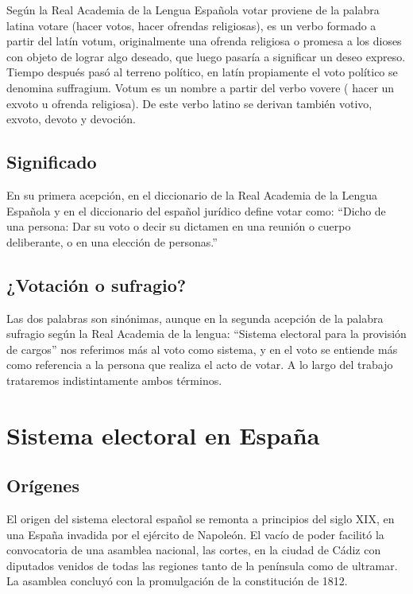 \documentclass[12pt,a4paper,]{book}
\numberwithin{dummy}{section}
\theoremstyle{ocrenumbox}
\theoremstyle{blacknumex}
\theoremstyle{blacknumbox}
\theoremstyle{ocrenum}
\theoremstyle{ocrenum}
\begin{document}
Según la Real Academia de la Lengua Española votar proviene de la
palabra latina votare (hacer votos, hacer ofrendas religiosas), es un
verbo formado a partir del latín votum, originalmente una ofrenda
religiosa o promesa a los dioses con objeto de lograr algo deseado, que
luego pasaría a significar un deseo expreso. Tiempo después pasó al
terreno político, en latín propiamente el voto político se denomina
suffragium. Votum es un nombre a partir del verbo vovere ( hacer un
exvoto u ofrenda religiosa). De este verbo latino se derivan también
votivo, exvoto, devoto y devoción.

\hypertarget{significado}{%
\subsection{Significado}\label{significado}}

En su primera acepción, en el diccionario de la Real Academia de la
Lengua Española y en el diccionario del español jurídico define votar
como: ``Dicho de una persona: Dar su voto o decir su dictamen en una
reunión o cuerpo deliberante, o en una elección de personas.''

\hypertarget{votaciuxf3n-o-sufragio}{%
\subsection{¿Votación o sufragio?}\label{votaciuxf3n-o-sufragio}}

Las dos palabras son sinónimas, aunque en la segunda acepción de la
palabra sufragio según la Real Academia de la lengua: ``Sistema
electoral para la provisión de cargos'' nos referimos más al voto como
sistema, y en el voto se entiende más como referencia a la persona que
realiza el acto de votar. A lo largo del trabajo trataremos
indistintamente ambos términos.

\hypertarget{sistema-electoral-en-espauxf1a}{%
\section{Sistema electoral en
España}\label{sistema-electoral-en-espauxf1a}}

\hypertarget{oruxedgenes}{%
\subsection{Orígenes}\label{oruxedgenes}}

El origen del sistema electoral español se remonta a principios del
siglo XIX, en una España invadida por el ejército de Napoleón. El vacío
de poder facilitó la convocatoria de una asamblea nacional, las cortes,
en la ciudad de Cádiz con diputados venidos de todas las regiones tanto
de la península como de ultramar. La asamblea concluyó con la
promulgación de la constitución de 1812.
\end{document}
